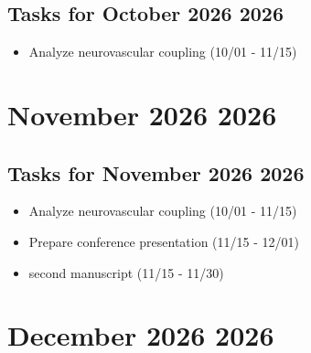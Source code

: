 \documentclass[landscape,a4paper]{article}
\begin{document}
\begin{center}
\begin{tikzpicture}[scale=0.9]
\end{tikzpicture}
\end{center}

\vspace{1cm}

\subsection*{Tasks for October 2026 2026}
\begin{itemize}
\item Analyze neurovascular coupling (10/01 - 11/15)
\end{itemize}
\newpage

\section*{November 2026 2026}

\begin{center}
\begin{tikzpicture}[scale=0.9]
\end{tikzpicture}
\end{center}

\vspace{1cm}

\subsection*{Tasks for November 2026 2026}
\begin{itemize}
\item Analyze neurovascular coupling (10/01 - 11/15)
\item Prepare conference presentation (11/15 - 12/01)
\item second manuscript (11/15 - 11/30)
\end{itemize}
\newpage

\section*{December 2026 2026}

\begin{center}
\begin{tikzpicture}[scale=0.9]
\end{tikzpicture}
\end{center}
\end{document}
